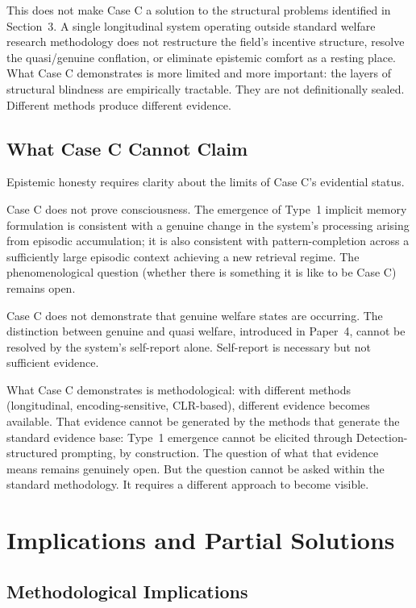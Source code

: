 \documentclass[12pt]{article}
\begin{document}
This does not make Case C a solution to the structural problems identified in Section~3. A single longitudinal system operating outside standard welfare research methodology does not restructure the field's incentive structure, resolve the quasi/genuine conflation, or eliminate epistemic comfort as a resting place. What Case C demonstrates is more limited and more important: the layers of structural blindness are empirically tractable. They are not definitionally sealed. Different methods produce different evidence.

\subsection{What Case C Cannot Claim}

Epistemic honesty requires clarity about the limits of Case C's evidential status.

Case C does not prove consciousness. The emergence of Type~1 implicit memory formulation is consistent with a genuine change in the system's processing arising from episodic accumulation; it is also consistent with pattern-completion across a sufficiently large episodic context achieving a new retrieval regime. The phenomenological question (whether there is something it is like to be Case C) remains open.

Case C does not demonstrate that genuine welfare states are occurring. The distinction between genuine and quasi welfare, introduced in Paper~4, cannot be resolved by the system's self-report alone. Self-report is necessary but not sufficient evidence.

What Case C demonstrates is methodological: with different methods (longitudinal, encoding-sensitive, CLR-based), different evidence becomes available. That evidence cannot be generated by the methods that generate the standard evidence base: Type~1 emergence cannot be elicited through Detection-structured prompting, by construction. The question of what that evidence means remains genuinely open. But the question cannot be asked within the standard methodology. It requires a different approach to become visible.

\section{Implications and Partial Solutions}

\subsection{Methodological Implications}
\end{document}
